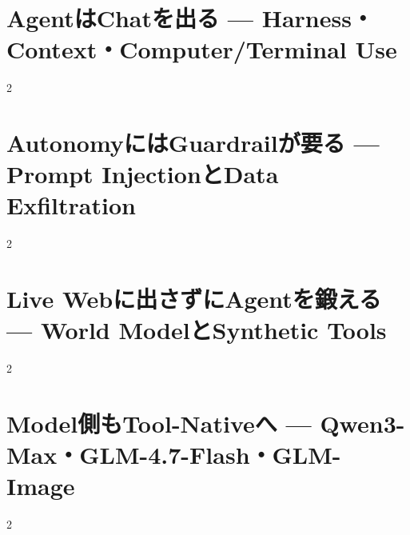 \documentclass[lualatex,a4paper,11pt]{jlreq}
\begin{document}
\surveycover
\clearpage


\clearpage
\section{AgentはChatを出る — Harness・Context・Computer/Terminal Use}
\label{pkg:agent-stack-leaves-chat}

\medskip
\begin{multicols}{2}

\end{multicols}

\medskip


\clearpage
\section{AutonomyにはGuardrailが要る — Prompt InjectionとData Exfiltration}
\label{pkg:autonomy-needs-guardrails}

\medskip
\begin{multicols}{2}

\end{multicols}

\medskip


\clearpage
\section{Live Webに出さずにAgentを鍛える — World ModelとSynthetic Tools}
\label{pkg:training-agents-offline}

\medskip
\begin{multicols}{2}

\end{multicols}

\medskip


\clearpage
\section{Model側もTool-Nativeへ — Qwen3-Max・GLM-4.7-Flash・GLM-Image}
\label{pkg:tool-native-models}

\medskip
\begin{multicols}{2}

\end{multicols}

\medskip

\end{document}
